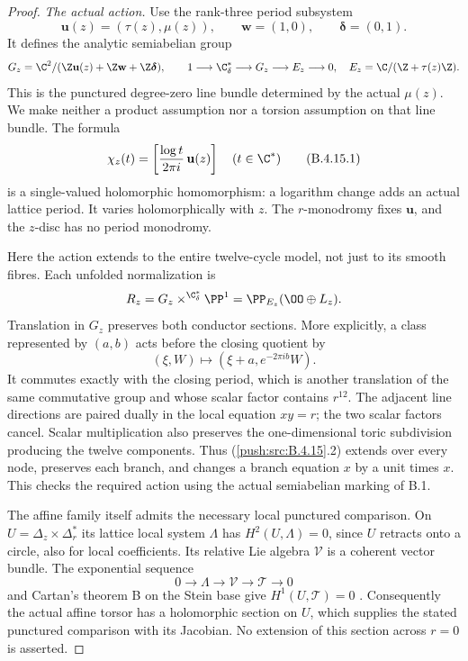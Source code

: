 \begin{proof}
\emph{The actual action.}
Use the rank-three period subsystem
\[
 \mathbf u(z)=(\tau(z),\mu(z)),\qquad
 \mathbf w=(1,0),\qquad \boldsymbol\delta=(0,1).
\]
It defines the analytic semiabelian group
\[
 G_z=\C^2/(\Z\mathbf u(z)+\Z\mathbf w+
                    \Z\boldsymbol\delta),
 \qquad
 1\longrightarrow\C^*_{\delta}\longrightarrow G_z
       \longrightarrow E_z\longrightarrow0,
 \quad E_z=\C/(\Z+\tau(z)\Z).
\]
This is the punctured degree-zero line bundle determined
by the actual $\mu(z)$. We make neither a product assumption
nor a torsion assumption on that line bundle. The formula
\[
 \chi_z(t)=
 \left[\frac{\log t}{2\pi i}\,\mathbf u(z)\right]
 \quad(t\in\C^*)
 \tag{B.4.15.1}
\]
is a single-valued holomorphic homomorphism: a logarithm
change adds an actual lattice period. It varies
holomorphically with $z$. The $r$-monodromy fixes
$\mathbf u$, and the $z$-disc has no period monodromy.

Here the action extends to the entire twelve-cycle model,
not just to its smooth fibres. Each unfolded normalization
is
\[
 R_z=G_z\mathbin{\times^{\C^*_{\delta}}}\PP^1
       =\PP_{E_z}(\OO\oplus L_z).
\]
Translation in $G_z$ preserves both conductor sections.
More explicitly, a class represented by $(a,b)$ acts
before the closing quotient by
\[
  (\xi,W)\longmapsto
            (\xi+a,e^{-2\pi i b}W).
 \tag{B.4.15.2}
\]
It commutes exactly with the closing period, which is
another translation of the same commutative group and
whose scalar factor contains $r^{12}$. The adjacent line
directions are paired dually in the local equation $xy=r$;
the two scalar factors cancel. Scalar multiplication also
preserves the one-dimensional toric subdivision producing
the twelve components. Thus (\ref{push:src:B.4.15}.2) extends over every
node, preserves each branch, and changes a branch equation
$x$ by a unit times $x$. This checks the required action
using the actual semiabelian marking of B.1.

The affine family itself admits the necessary local
punctured comparison. On
$U=\Delta_z\times\Delta_r^*$ its lattice local system
$\Lambda$ has $H^2(U,\Lambda)=0$, since $U$ retracts onto
a circle, also for local coefficients. Its relative Lie
algebra $\mathcal V$ is a coherent vector bundle. The
exponential sequence
\[
 0\longrightarrow\Lambda\longrightarrow\mathcal V
       \longrightarrow\mathcal T\longrightarrow0
\]
and Cartan's theorem B on the Stein base give
$H^1(U,\mathcal T)=0$ \citep{Cartan1952B_AB}.
Consequently the actual affine torsor has a holomorphic
section on $U$, which supplies the stated punctured
comparison with its Jacobian. No extension of this
section across $r=0$ is asserted.


\end{proof}
